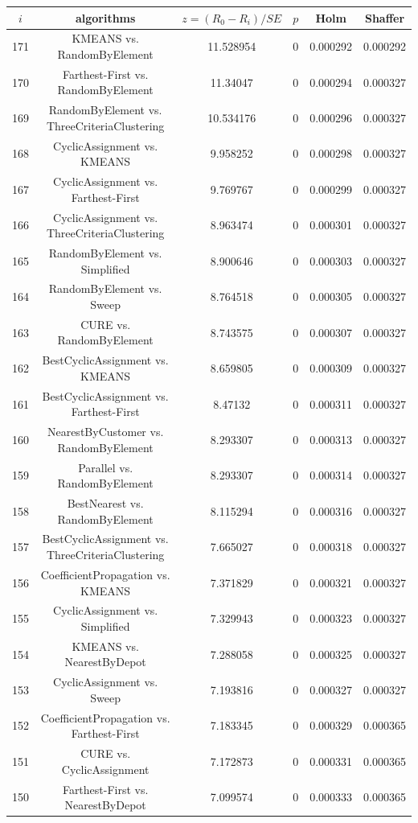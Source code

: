 \documentclass[a4paper,10pt]{article}
\begin{document}
\begin{landscape}
\begin{table}[!htp]
\centering\scriptsize
\begin{tabular}{cccccc}
$i$&algorithms&$z=(R_0 - R_i)/SE$&$p$&Holm&Shaffer\\
\hline171&KMEANS vs. RandomByElement&11.528954&0&0.000292&0.000292\\
170&Farthest-First vs. RandomByElement&11.34047&0&0.000294&0.000327\\
169&RandomByElement vs. ThreeCriteriaClustering&10.534176&0&0.000296&0.000327\\
168&CyclicAssignment vs. KMEANS&9.958252&0&0.000298&0.000327\\
167&CyclicAssignment vs. Farthest-First&9.769767&0&0.000299&0.000327\\
166&CyclicAssignment vs. ThreeCriteriaClustering&8.963474&0&0.000301&0.000327\\
165&RandomByElement vs. Simplified&8.900646&0&0.000303&0.000327\\
164&RandomByElement vs. Sweep&8.764518&0&0.000305&0.000327\\
163&CURE vs. RandomByElement&8.743575&0&0.000307&0.000327\\
162&BestCyclicAssignment vs. KMEANS&8.659805&0&0.000309&0.000327\\
161&BestCyclicAssignment vs. Farthest-First&8.47132&0&0.000311&0.000327\\
160&NearestByCustomer vs. RandomByElement&8.293307&0&0.000313&0.000327\\
159&Parallel vs. RandomByElement&8.293307&0&0.000314&0.000327\\
158&BestNearest vs. RandomByElement&8.115294&0&0.000316&0.000327\\
157&BestCyclicAssignment vs. ThreeCriteriaClustering&7.665027&0&0.000318&0.000327\\
156&CoefficientPropagation vs. KMEANS&7.371829&0&0.000321&0.000327\\
155&CyclicAssignment vs. Simplified&7.329943&0&0.000323&0.000327\\
154&KMEANS vs. NearestByDepot&7.288058&0&0.000325&0.000327\\
153&CyclicAssignment vs. Sweep&7.193816&0&0.000327&0.000327\\
152&CoefficientPropagation vs. Farthest-First&7.183345&0&0.000329&0.000365\\
151&CURE vs. CyclicAssignment&7.172873&0&0.000331&0.000365\\
150&Farthest-First vs. NearestByDepot&7.099574&0&0.000333&0.000365\\

\end{tabular}
\end{table}
\end{landscape}
\end{document}
